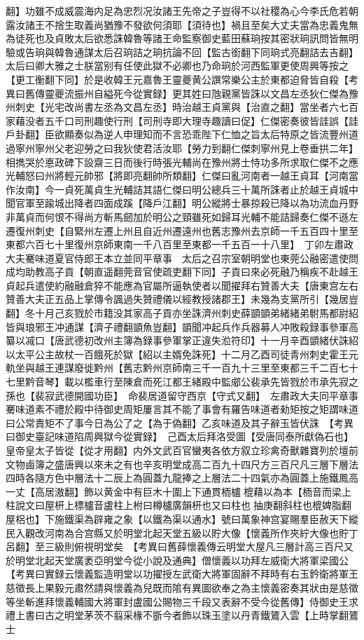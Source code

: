 翻】功雖不成威震海内足為忠烈况汝諸王先帝之子豈得不以社稷為心今李氏危若朝露汝諸王不捨生取義尚猶豫不發欲何須耶【須待也】禍且至矣大丈夫當為忠義鬼無為徒死也及貞敗太后欲悉誅韓魯等諸王命監察御史藍田蘇珦按其密狀珦訊問皆無明驗或告珦與韓魯通謀太后召珦詰之珦抗論不回【監古銜翻下同珦式亮翻詰去吉翻】太后曰卿大雅之士朕當别有任使此獄不必卿也乃命珦於河西監軍更使周興等按之【更工衡翻下同】於是收韓王元嘉魯王靈夔黄公譔常樂公主於東都迫脅皆自殺【考異曰舊傳靈夔流振州自縊死今從實録】更其姓曰虺親黨皆誅以文昌左丞狄仁傑為豫州刺史【光宅改尚書左丞為文昌左丞】時治越王貞黨與【治直之翻】當坐者六七百家藉没者五千口司刑趣使行刑【司刑寺即大理寺趣讀曰促】仁傑密奏彼皆詿誤【詿戶卦翻】臣欲顯奏似為逆人申理知而不言恐乖陛下仁恤之旨太后特原之皆流豐州道過寧州寧州父老迎勞之曰我狄使君活汝耶【勞力到翻仁傑刺寧州見上卷垂拱二年】相擕哭於悳政碑下設齋三日而後行時張光輔尚在豫州將士恃功多所求取仁傑不之應光輔怒曰州將輕元帥邪【將即亮翻帥所類翻】仁傑曰亂河南者一越王貞耳【河南當作汝南】今一貞死萬貞生光輔詰其語仁傑曰明公總兵三十萬所誅者止於越王貞城中聞官軍至踰城出降者四面成蹊【降戶江翻】明公縱將士暴掠殺已降以為功流血丹野非萬貞而何恨不得尚方斬馬劒加於明公之頸雖死如歸耳光輔不能詰歸奏仁傑不遜左遷復州刺史【自緊州左遷上州且自近州遷遠州也舊志豫州去京師一千五百四十里至東都六百七十里復州京師東南一千八百里至東都一千五百一十八里】　丁卯左肅政大夫騫味道夏官侍郎王本立並同平章事　太后之召宗室朝明堂也東莞公融密遣使問成均助教高子貢【朝直遥翻莞音官使疏吏翻下同】子貢曰來必死融乃稱疾不赴越王貞起兵遣使約融融倉猝不能應為官屬所逼執使者以聞擢拜右贊善大夫【唐東宫左右贊善大夫正五品上掌傳令諷過失贊禮儀以經教授諸郡王】未幾為支黨所引【幾居豈翻】冬十月己亥戮於市籍没其家高子貢亦坐誅濟州刺史薛顗顗弟緒緒弟駙馬都尉紹皆與琅邪王冲通謀【濟子禮翻顗魚豈翻】顗聞冲起兵作兵器募人冲敗殺録事參軍高纂以㓕口【唐武德初改州主簿為録事參軍掌正違失涖符印】十一月辛酉顗緒伏誅紹以太平公主故杖一百餓死於獄【紹以主婿免誅死】十二月乙酉司徒青州刺史霍王元軌坐與越王連謀廢徙黔州【舊志黔州京師南三千一百九十三里至東都三千二百七十七里黔音琴】載以檻車行至陳倉而死江都王緒殿中監郕公裴承先皆戮於市承先寂之孫也【裴寂武德開國功臣】　命裴居道留守西京【守式又翻】　左肅政大夫同平章事騫味道素不禮於殿中待御史周矩屢言其不能了事會有羅告味道者勑矩按之矩謂味道曰公常責矩不了事今日為公了之【為于偽翻】乙亥味道及其子辭玉皆伏誅　【考異曰御史臺記味道陷周興獄今從實録】　己酉太后拜洛受圖【受唐同泰所獻偽石也】皇帝皇太子皆從【從才用翻】内外文武百官蠻夷各依方叙立珍禽奇獸雜寶列於壇前文物鹵簿之盛唐興以來未之有也辛亥明堂成高二百九十四尺方三百尺凡三層下層法四時各隨方色中層法十二辰上為圓蓋九龍捧之上層法二十四氣亦為圓蓋上施鐵鳳高一丈【高居滶翻】飾以黄金中有巨木十圍上下通貫栭櫨㮰藉以為本【栭音而梁上柱說文曰屋枅上標櫨音盧柱上柎曰樽櫨廣韻枅也又曰柱也抽庚翻斜柱也㮰婢脂翻屋梠也】下施鐵渠為辟雍之象【以鐵為渠以通水】號曰萬象神宫宴賜羣臣赦天下縱民入觀改河南為合宫縣又於明堂北起天堂五級以貯大像【懷義所作夾紵大像也貯丁呂翻】至三級則俯視明堂矣　【考異曰舊薛懷義傳云明堂大屋凡三層計高三百尺又於明堂北起天堂廣袤亞明堂今從小說及通典】僧懷義以功拜左威衛大將軍梁國公【考異曰實録云懷義監造明堂以功擢授左武衛大將軍固辭不拜時有右玉鈐衛將軍王慈徵長上果毅元肅然請與懷義為兒既而隂有異圖欲奉之為主懷義密奏其狀由是慈徵等坐斬進拜懷義輔國大將軍封盧國公賜物三千段又表辭不受今從舊傳】侍御史王求禮上書曰古之明堂茅茨不翦采椽不斵今者飾以珠玉塗以丹青鐵鷟入雲【上時掌翻鷟士